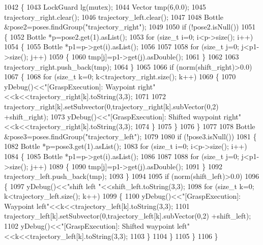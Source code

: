 \begin{DoxyCode}
1042 \{
1043     LockGuard lg(mutex);
1044     Vector tmp(6,0.0);
1045     trajectory\_right.clear();
1046     trajectory\_left.clear();
1047 
1048     Bottle &pose2=poses.findGroup(\textcolor{stringliteral}{"trajectory\_right"});
1049 
1050     \textcolor{keywordflow}{if} (!pose2.isNull())
1051     \{
1052         Bottle *p=pose2.get(1).asList();
1053         \textcolor{keywordflow}{for} (\textcolor{keywordtype}{size\_t} i=0; i<p->size(); i++)
1054         \{
1055             Bottle *p1=p->get(i).asList();
1056 
1057 
1058             \textcolor{keywordflow}{for} (\textcolor{keywordtype}{size\_t} j=0; j<p1->size(); j++)
1059             \{
1060                 tmp[j]=p1->get(j).asDouble();
1061             \}
1062 
1063             trajectory\_right.push\_back(tmp);
1064         \}
1065 
1066         \textcolor{keywordflow}{if} (norm(shift\_right)>0.0)
1067         \{
1068             \textcolor{keywordflow}{for} (\textcolor{keywordtype}{size\_t} k=0; k<trajectory\_right.size(); k++)
1069             \{
1070                 yDebug()<<\textcolor{stringliteral}{"[GraspExecution]: Waypoint right"}<<k<<trajectory\_right[k].toString(3,3);
1071                 
1072                 trajectory\_right[k].setSubvector(0,trajectory\_right[k].subVector(0,2) +shift\_right);
1073                 yDebug()<<\textcolor{stringliteral}{"[GraspExecution]: Shifted waypoint right"}<<k<<trajectory\_right[k].toString(3,3);
1074             \}
1075         \}
1076     \}
1077 
1078     Bottle &pose3=poses.findGroup(\textcolor{stringliteral}{"trajectory\_left"});
1079 
1080     \textcolor{keywordflow}{if} (!pose3.isNull())
1081     \{
1082         Bottle *p=pose3.get(1).asList();
1083         \textcolor{keywordflow}{for} (\textcolor{keywordtype}{size\_t} i=0; i<p->size(); i++)
1084         \{
1085             Bottle *p1=p->get(i).asList();
1086 
1087 
1088             \textcolor{keywordflow}{for} (\textcolor{keywordtype}{size\_t} j=0; j<p1->size(); j++)
1089             \{
1090                 tmp[j]=p1->get(j).asDouble();
1091             \}
1092             trajectory\_left.push\_back(tmp);
1093         \}
1094 
1095         \textcolor{keywordflow}{if} (norm(shift\_left)>0.0)
1096         \{
1097             yDebug()<<\textcolor{stringliteral}{"shift left "}<<shift\_left.toString(3,3);
1098             \textcolor{keywordflow}{for} (\textcolor{keywordtype}{size\_t} k=0; k<trajectory\_left.size(); k++)
1099             \{
1100                 yDebug()<<\textcolor{stringliteral}{"[GraspExecution]: Waypoint left"}<<k<<trajectory\_left[k].toString(3,3);
1101                 trajectory\_left[k].setSubvector(0,trajectory\_left[k].subVector(0,2) +shift\_left);
1102                 yDebug()<<\textcolor{stringliteral}{"[GraspExecution]: Shifted waypoint left"}<<k<<trajectory\_left[k].toString(3,3);
1103             \}
1104         \}
1105     \}
1106 \}
\end{DoxyCode}
